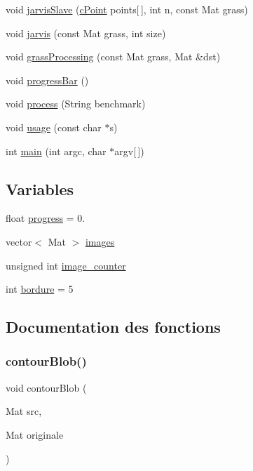 \begin{DoxyCompactItemize}
void \hyperlink{video-player_8cpp_a33efba2a6b739b7454779110219f0076}{jarvis\+Slave} (\hyperlink{structcPoint}{c\+Point} points\mbox{[}$\,$\mbox{]}, int n, const Mat grass)
\item 
void \hyperlink{video-player_8cpp_a6a56ec37b1d523d611f7533a78dbe25e}{jarvis} (const Mat grass, int size)
\item 
void \hyperlink{video-player_8cpp_a7d360f08236891102b0383d30831c3d7}{grass\+Processing} (const Mat grass, Mat \&dst)
\item 
void \hyperlink{video-player_8cpp_a25ff1eec5d5c041057fd097232df5dc8}{progress\+Bar} ()
\item 
void \hyperlink{video-player_8cpp_ac24faa0dbaa01a285ac62f3683a5e0b1}{process} (String benchmark)
\item 
void \hyperlink{video-player_8cpp_a6d8fa02fe70636ca21ee1ffef9de4880}{usage} (const char $\ast$s)
\item 
int \hyperlink{video-player_8cpp_a0ddf1224851353fc92bfbff6f499fa97}{main} (int argc, char $\ast$argv\mbox{[}$\,$\mbox{]})
\end{DoxyCompactItemize}
\subsection*{Variables}
\begin{DoxyCompactItemize}
\item 
float \hyperlink{video-player_8cpp_ac7abb4766cd3f65c31f56279d7decff8}{progress} = 0.
\item 
vector$<$ Mat $>$ \hyperlink{video-player_8cpp_abd83dabb4c2838022aa129dfa446286b}{images}
\item 
unsigned int \hyperlink{video-player_8cpp_a8a06f17ddfffacbf634fed81c6d18e43}{image\+\_\+counter}
\item 
int \hyperlink{video-player_8cpp_a26f1a936d933f85e70ff48ce26f2bdf1}{bordure} = 5
\end{DoxyCompactItemize}


\subsection{Documentation des fonctions}
\mbox{\label{video-player_8cpp_add22166c90cbb599c9d4ed5bb260e43a}} 
\subsubsection{\texorpdfstring{contour\+Blob()}{contourBlob()}}
{\footnotesize\ttfamily void contour\+Blob (\begin{DoxyParamCaption}\item[{Mat}]{src,  }\item[{Mat}]{originale }\end{DoxyParamCaption})}

